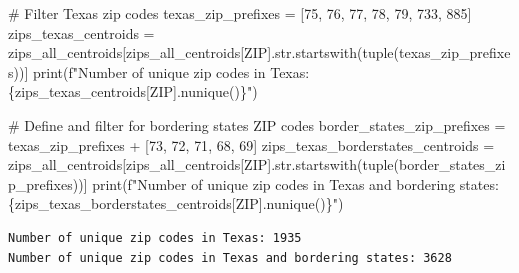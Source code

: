 \documentclass[
  letterpaper,
  DIV=11,
  numbers=noendperiod]{scrartcl}
\newenvironment{Shaded}{\begin{snugshade}}{\end{snugshade}}
\newcommand{\BuiltInTok}[1]{\textcolor[rgb]{0.00,0.23,0.31}{#1}}
\newcommand{\CommentTok}[1]{\textcolor[rgb]{0.37,0.37,0.37}{#1}}
\newcommand{\NormalTok}[1]{\textcolor[rgb]{0.00,0.23,0.31}{#1}}
\newcommand{\OperatorTok}[1]{\textcolor[rgb]{0.37,0.37,0.37}{#1}}
\newcommand{\SpecialCharTok}[1]{\textcolor[rgb]{0.37,0.37,0.37}{#1}}
\newcommand{\SpecialStringTok}[1]{\textcolor[rgb]{0.13,0.47,0.30}{#1}}
\newcommand{\StringTok}[1]{\textcolor[rgb]{0.13,0.47,0.30}{#1}}
\begin{document}
\begin{Shaded}
\begin{Highlighting}[]
\CommentTok{\# Filter Texas zip codes}
\NormalTok{texas\_zip\_prefixes }\OperatorTok{=}\NormalTok{ [}\StringTok{\textquotesingle{}75\textquotesingle{}}\NormalTok{, }\StringTok{\textquotesingle{}76\textquotesingle{}}\NormalTok{, }\StringTok{\textquotesingle{}77\textquotesingle{}}\NormalTok{, }\StringTok{\textquotesingle{}78\textquotesingle{}}\NormalTok{, }\StringTok{\textquotesingle{}79\textquotesingle{}}\NormalTok{, }\StringTok{\textquotesingle{}733\textquotesingle{}}\NormalTok{, }\StringTok{\textquotesingle{}885\textquotesingle{}}\NormalTok{]}
\NormalTok{zips\_texas\_centroids }\OperatorTok{=}\NormalTok{ zips\_all\_centroids[zips\_all\_centroids[}\StringTok{\textquotesingle{}ZIP\textquotesingle{}}\NormalTok{].}\BuiltInTok{str}\NormalTok{.startswith(}\BuiltInTok{tuple}\NormalTok{(texas\_zip\_prefixes))]}
\BuiltInTok{print}\NormalTok{(}\SpecialStringTok{f"Number of unique zip codes in Texas: }\SpecialCharTok{\{}\NormalTok{zips\_texas\_centroids[}\StringTok{\textquotesingle{}ZIP\textquotesingle{}}\NormalTok{]}\SpecialCharTok{.}\NormalTok{nunique()}\SpecialCharTok{\}}\SpecialStringTok{"}\NormalTok{)}

\CommentTok{\# Define and filter for bordering states\textquotesingle{} ZIP codes}
\NormalTok{border\_states\_zip\_prefixes }\OperatorTok{=}\NormalTok{ texas\_zip\_prefixes }\OperatorTok{+}\NormalTok{ [}\StringTok{\textquotesingle{}73\textquotesingle{}}\NormalTok{, }\StringTok{\textquotesingle{}72\textquotesingle{}}\NormalTok{, }\StringTok{\textquotesingle{}71\textquotesingle{}}\NormalTok{, }\StringTok{\textquotesingle{}68\textquotesingle{}}\NormalTok{, }\StringTok{\textquotesingle{}69\textquotesingle{}}\NormalTok{]}
\NormalTok{zips\_texas\_borderstates\_centroids }\OperatorTok{=}\NormalTok{ zips\_all\_centroids[zips\_all\_centroids[}\StringTok{\textquotesingle{}ZIP\textquotesingle{}}\NormalTok{].}\BuiltInTok{str}\NormalTok{.startswith(}\BuiltInTok{tuple}\NormalTok{(border\_states\_zip\_prefixes))]}
\BuiltInTok{print}\NormalTok{(}\SpecialStringTok{f"Number of unique zip codes in Texas and bordering states: }\SpecialCharTok{\{}\NormalTok{zips\_texas\_borderstates\_centroids[}\StringTok{\textquotesingle{}ZIP\textquotesingle{}}\NormalTok{]}\SpecialCharTok{.}\NormalTok{nunique()}\SpecialCharTok{\}}\SpecialStringTok{"}\NormalTok{)}
\end{Highlighting}
\end{Shaded}

\begin{verbatim}
Number of unique zip codes in Texas: 1935
Number of unique zip codes in Texas and bordering states: 3628
\end{verbatim}
\end{document}
